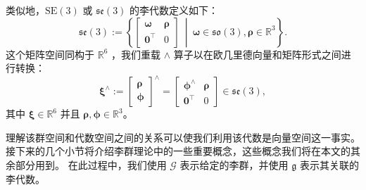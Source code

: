 类似地，$\mathrm{SE}(3)$ 或 $\mathfrak{se}(3)$ 的李代数定义如下： 
\begin{equation}
    \mathfrak{se}(3) := 
    \left\{ \left[ \begin{array}{cc}
        \boldsymbol{\omega} & \boldsymbol{\rho}  \\
        \mathbf{0}^\top & 0
    \end{array} \right]~ \middle| ~\boldsymbol{\omega} \in \mathfrak{so}(3), \boldsymbol{\rho} \in \mathbb{R}^3 \right\}.
\end{equation}
这个矩阵空间同构于 $\mathbb{R}^6$ ，我们重载 $\wedge$ 算子以在欧几里德向量和矩阵形式之间进行转换： 
\begin{equation}
    \boldsymbol{\xi}^\wedge := \left[ \begin{array}{c}
         \boldsymbol{\rho} \\
          \boldsymbol{\phi}
    \end{array} \right]^\wedge = 
    \left[ \begin{array}{cc}
        \boldsymbol{\phi}^\wedge & \boldsymbol{\rho}  \\
        \mathbf{0}^\top & 0
    \end{array} \right] \in \mathfrak{se}(3),
\end{equation}
其中 $\boldsymbol{\xi} \in \mathbb{R}^6$ 并且 $\boldsymbol{\rho}, \boldsymbol{\phi} \in \mathbb{R}^3$。

理解该群空间和代数空间之间的关系可以使我们利用该代数是向量空间这一事实。 
接下来的几个小节将介绍李群理论中的一些重要概念，这些概念我们将在本文的其余部分用到。 
在此过程中，我们使用 $\mathcal{G}$ 表示给定的李群，并使用 $\mathfrak{g}$ 表示其关联的李代数。 

